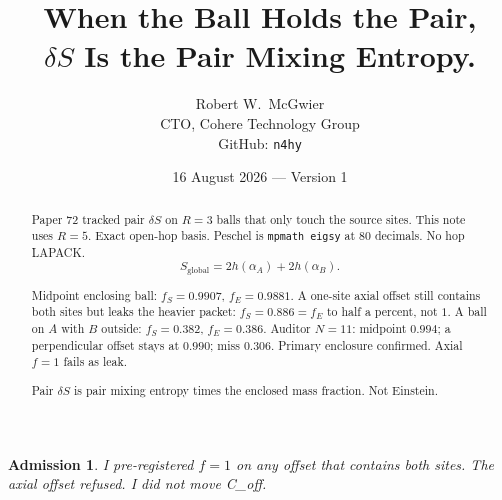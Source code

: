 \documentclass[11pt]{article}
\title{\textbf{When the Ball Holds the Pair,\\
$\delta S$ Is the Pair Mixing Entropy.}}
\author{Robert W.\ McGwier\\
\small CTO, Cohere Technology Group\\
\small GitHub: \texttt{n4hy}}
\date{16 August 2026 --- Version 1}
\newtheorem*{admission}{Admission}
\begin{document}
\maketitle

\begin{abstract}
\noindent
Paper 72 tracked pair $\delta S$ on $R=3$ balls that
only touch the source sites. This note uses $R=5$.
Exact open-hop basis. Peschel is \texttt{mpmath eigsy}
at $80$ decimals. No hop LAPACK.
\[
S_{\mathrm{global}}=2h(\alpha_A)+2h(\alpha_B).
\]

Midpoint enclosing ball: $f_S=0.9907$, $f_E=0.9881$.
A one-site axial offset still contains both sites
but leaks the heavier packet: $f_S=0.886=f_E$ to
half a percent, not $1$. A ball on $A$ with $B$
outside: $f_S=0.382$, $f_E=0.386$.
Auditor $N=11$: midpoint $0.994$; a perpendicular
offset stays at $0.990$; miss $0.306$. Primary
enclosure confirmed. Axial $f=1$ fails as leak.

Pair $\delta S$ is pair mixing entropy times the
enclosed mass fraction. Not Einstein.
\end{abstract}

\begin{admission}
I pre-registered $f=1$ on any offset that contains
both sites. The axial offset refused. I did not
move C\_off.
\end{admission}
\end{document}
